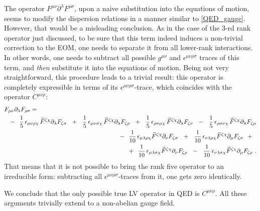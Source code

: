 \documentclass[12pt,preprintnumbers,nofootinbib]{revtex4}
\newcommand{\p}{\partial}
\newcommand{\wt}{\widetilde}
\begin{document}
	The operator
$ F^{\mu\nu} \partial^\lambda F^{\rho\sigma} $,
	upon a naive substitution
	into the equations of motion, 
	seems to modify the dispersion relations in a manner similar to \eqref{QED_gauge}.
	However, that would be a misleading conclusion.
	As in the case of the 3-rd rank operator just discussed,
	to be sure that this term indeed induces a non-trivial 
	correction to the EOM, one needs to separate it from all
	lower-rank interactions.
	In other words, one needs to subtract all possible 
	$ g^{\mu\nu} $ and $ \epsilon^{\mu\nu\rho\sigma} $ 
	traces of this term, and {\it then} substitute it into the
	equations of motion.
	Being not very straightforward, this procedure leads to a 
	trivial result: this operator is completely expressible
	in terms of its $ \epsilon^{\mu\nu\rho\sigma} $-trace, which
	coincides with the operator $ C^{\mu\nu\rho} $:
\begin{eqnarray*}
\lefteqn{
	F_{\mu\nu} \p_\lambda F_{\rho\sigma} = 
	} &&
	\\
	&&
	-~~ 
	\frac{1}{5}\,\epsilon_{\mu\nu\rho\chi} \,
	\wt{F}^{\zeta\chi}\p_\lambda F_{\zeta\sigma} 
 	~~+~~
	\frac{1}{5}\,\epsilon_{\mu\nu\sigma\chi} \,
	\wt{F}^{\zeta\chi}\p_\lambda F_{\zeta\rho} 
	~~+~~
	\frac{1}{5}\,\epsilon_{\rho\sigma\mu\chi} \,
	\wt{F}^{\zeta\chi}\p_\lambda F_{\zeta\nu} 
 	~~-~~
	\frac{1}{5}\,\epsilon_{\rho\sigma\nu\chi} \,
	\wt{F}^{\zeta\chi}\p_\lambda F_{\zeta\mu}
	\\
	&&
	-~~
	\frac{1}{10}\,\epsilon_{\mu\lambda\rho\chi} 
	\wt{F}^{\zeta\chi}\p_\nu F_{\zeta\sigma} 
	~~+~~
	\frac{1}{10}\,\epsilon_{\nu\lambda\rho\chi} 
	\wt{F}^{\zeta\chi}\p_\mu F_{\zeta\sigma} 
	~~+~~
	\\
	&&
	+~~
	\frac{1}{10}\,\epsilon_{\mu\lambda\sigma\chi} 
	\wt{F}^{\zeta\chi}\p_\nu F_{\zeta\rho} 
	~~-~~
	\frac{1}{10}\,\epsilon_{\nu\lambda\sigma\chi} 
	\wt{F}^{\zeta\chi}\p_\mu F_{\zeta\rho}
	~.
\end{eqnarray*}
	That means that it is not possible to bring the rank five operator
	to an irreducible form: subtracting all
	$ \epsilon^{\mu\nu\rho\sigma} $-traces from it, one gets
	zero identically. 

	We conclude that the only possible true
	LV operator in QED is $ C^{\mu\nu\rho} $.  
	All these arguments trivially extend to a non-abelian gauge
	field.
\end{document}
